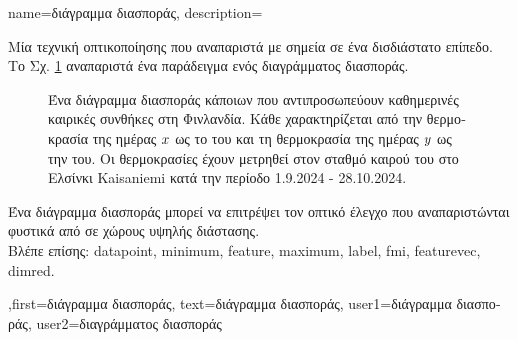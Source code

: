 {name={\foreignlanguage{greek}{διάγραμμα διασποράς}}, 
	description={\foreignlanguage{greek}{Μία} 
		\foreignlanguage{greek}{τεχνική οπτικοποίησης που αναπαριστά}  \foreignlanguage{greek}{με σημεία
		σε ένα δισδιάστατο επίπεδο. 
		Το Σχ.} \ref{fig_scatterplot_temp_FMI_dict} \foreignlanguage{greek}{αναπαριστά ένα παράδειγμα ενός διαγράμματος διασποράς.}   
		\begin{figure}[H]
			\begin{center}
				\vspace*{-10mm}
			\end{center}
			{
			\caption{\foreignlanguage{greek}{Ένα διάγραμμα διασποράς κάποιων}  \foreignlanguage{greek}{που 
				αντιπροσωπεύουν καθημερινές καιρικές συνθήκες στη Φινλανδία. Κάθε} 
				 \foreignlanguage{greek}{χαρακτηρίζεται από την}  
				\foreignlanguage{greek}{θερμοκρασία της ημέρας $x$ ως το} 
				 \foreignlanguage{greek}{του και τη}  \foreignlanguage{greek}{θερμοκρασία 
				της ημέρας $y$ ως την}  \foreignlanguage{greek}{του. 
				Οι θερμοκρασίες έχουν μετρηθεί στον σταθμό καιρού του}  \foreignlanguage{greek}{στο Ελσίνκι} 
				Kaisaniemi \foreignlanguage{greek}{κατά την περίοδο} 1.9.2024 - 28.10.2024.}
			\label{fig_scatterplot_temp_FMI_dict}}
			\vspace*{-3mm}
			\end{figure}
		\foreignlanguage{greek}{Ένα διάγραμμα διασποράς μπορεί να επιτρέψει τον οπτικό έλεγχο}  
		\foreignlanguage{greek}{που αναπαριστώνται φυστικά από}  
		\foreignlanguage{greek}{σε χώρους υψηλής διάστασης.}\\
			 \foreignlanguage{greek}{Βλέπε επίσης:} \gls{datapoint}, \gls{minimum}, \gls{feature}, \gls{maximum}, \gls{label}, \gls{fmi}, \gls{featurevec}, \gls{dimred}.
		},first={\foreignlanguage{greek}{διάγραμμα διασποράς}},
		text={\foreignlanguage{greek}{διάγραμμα διασποράς}},
		user1={\foreignlanguage{greek}{διάγραμμα διασποράς}}, %
  		user2={\foreignlanguage{greek}{διαγράμματος διασποράς}} %
}

